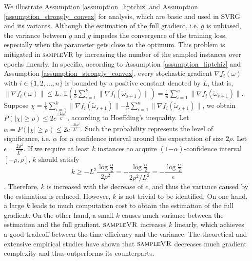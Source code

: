 \documentclass[letterpaper]{article}
\begin{document}
We illustrate Assumption \ref{assumption_liptchiz} and Assumption \ref{assumption_strongly_convex} for analysis, which are basic and used in SVRG and its variants. Although the estimation of the full gradient, i.e. $\dot{g}$ is unbiased, the variance between $\dot{g}$ and $g$ impedes the convergence of the training loss, especially when the parameter gets close to the optimum. This problem is mitigated in \textsc{sampleVR} by increasing the number of the sampled instances  over epochs linearly.     In specific, according to Assumption \ref{assumption_liptchiz} and Assumption \ref{assumption_strongly_convex}, every stochastic gradient $\nabla f_i(\omega)$ with $i\in\{1,2, ..., n\}$ is bounded by a positive constant denoted by $L$, that is, $\parallel  \nabla f_i(\omega)  \parallel \le L$.  $\mathbb{E}\left(\frac{1}{k}\sum\limits_{i=1}^k\parallel  \nabla f_i(\tilde{\omega}_{s+1})  \parallel\right) = \frac{1}{n}\sum\limits_{i=1}^n\parallel \nabla f_i(\tilde{\omega}_{s+1})\parallel$. Suppose $\chi  = \frac{1}{k}\sum\limits_{i=1}^k\parallel \nabla f_i(\tilde{\omega}_{s+1})  \parallel - \frac{1}{n}\sum\limits_{i=1}^n\parallel \nabla f_i(\tilde{\omega}_{s+1})\parallel$, we obtain $P( | \chi | \ge \rho)  \le 2e^{\frac{-2k\rho^2}{L^2}}$, according to Hoeffding's inequality. Let $\alpha = P(| \chi | \ge \rho) \le 2e^{\frac{-2k\rho^2}{L^2}}$. Such the probability represents the level of significance, i.e. $\alpha$   for a confidence interval  around the expectation of size $2\rho$. Let $\epsilon = \frac{2\rho^2}{L^2}$. If we require at least $k$ instances  to acquire $(1\mathrm{-}\alpha)$-confidence interval $[-\rho, \rho]$,  $k$ should satisfy
\begin{equation}
\label{equ_estimate_samples_lower_bound}
k\ge - L^2\frac{\log \frac{\alpha}{2}}{2\rho^2} = - \frac{\log \frac{\alpha}{2}}{2\rho^2/L^2} = - \frac{\log \frac{\alpha}{2}}{\epsilon}
\end{equation}.  Therefore, $k$ is increased with the decrease of $\epsilon$, and thus the variance caused by the estimation  is reduced.  However, $k$ is not trivial to be identified. On one hand, a large $k$ leads to much computation cost to obtain the estimation of the full gradient.   On the other hand, a small $k$ causes much variance between the estimation and the full gradient.  $\textsc{sampleVR}$ increases $k$ linearly, which achieves a good tradeoff between the time efficiency and the variance. The theoretical and extensive empirical studies have shown that $\textsc{sampleVR}$ decreases much gradient complexity and  thus outperforms its counterparts.
\end{document}

